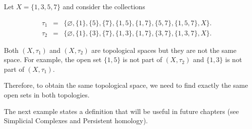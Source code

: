 \documentclass[
	fontsize=10pt, %
	twoside=false, %
	secnumdepth=1, %
]{kaobook}
\begin{document}
\begin{example}
Let $X=\{1,3,5,7\}$ and consider the collections

\begin{eqnarray*}
\tau_1 &=& \{\varnothing, \{1\},\{5\},\{7\},\{1,5\},\{1,7\},\{5,7\},\{1,5,7\},X\}. \\
\tau_2 &=& \{\varnothing, \{1\},\{3\},\{7\},\{1,3\},\{1,7\},\{3,7\},\{1,3,7\},X\}.
\end{eqnarray*}

Both $(X,\tau_1)$ and $(X,\tau_2)$ are topological spaces but they are not the same space. For example, the open set $\{1,5\}$ is not part of $(X,\tau_2)$ and $\{1,3\}$ is not part of $(X,\tau_1).$ 

Therefore, to obtain the same topological space, we need to find exactly the same open sets in both topologies.
\end{example}

The next example states a definition that will be useful in future chapters (see Simplicial Complexes and Persistent homology). 
\end{document}
